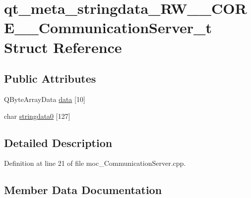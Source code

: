 \hypertarget{structqt__meta__stringdata___r_w_____c_o_r_e_____communication_server__t}{}\section{qt\+\_\+meta\+\_\+stringdata\+\_\+\+R\+W\+\_\+\+\_\+\+C\+O\+R\+E\+\_\+\+\_\+\+Communication\+Server\+\_\+t Struct Reference}
\label{structqt__meta__stringdata___r_w_____c_o_r_e_____communication_server__t}
\subsection*{Public Attributes}
\begin{DoxyCompactItemize}
\item 
Q\+Byte\+Array\+Data \hyperlink{structqt__meta__stringdata___r_w_____c_o_r_e_____communication_server__t_a148f2883b6139a510eb3143b18d3d78b}{data} \mbox{[}10\mbox{]}
\item 
char \hyperlink{structqt__meta__stringdata___r_w_____c_o_r_e_____communication_server__t_acf15bb0f0d6b7cf64db912d68f91c534}{stringdata0} \mbox{[}127\mbox{]}
\end{DoxyCompactItemize}


\subsection{Detailed Description}


Definition at line 21 of file moc\+\_\+\+Communication\+Server.\+cpp.



\subsection{Member Data Documentation}
\hypertarget{structqt__meta__stringdata___r_w_____c_o_r_e_____communication_server__t_a148f2883b6139a510eb3143b18d3d78b}{}\label{structqt__meta__stringdata___r_w_____c_o_r_e_____communication_server__t_a148f2883b6139a510eb3143b18d3d78b} 
